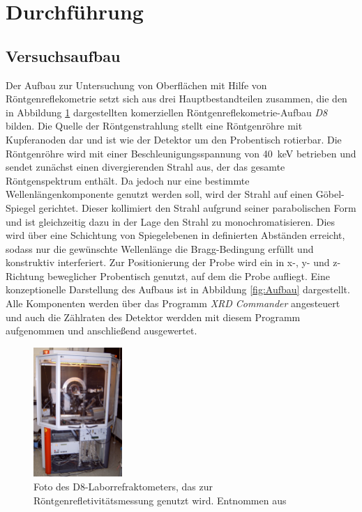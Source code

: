 \newpage
\section{Durchführung}
    \subsection{Versuchsaufbau}
        Der Aufbau zur Untersuchung von Oberflächen mit Hilfe von Röntgenreflekometrie setzt sich aus drei Hauptbestandteilen zusammen, die den in Abbildung \ref{fig:D8} dargestellten komerziellen 
        Röntgenreflekometrie-Aufbau \textit{D8} bilden. Die Quelle der Röntgenstrahlung stellt eine Röntgenröhre mit Kupferanoden dar und ist 
        wie der Detektor um den Probentisch rotierbar. Die Röntgenröhre wird mit einer Beschleunigungsspannung von \SI{40}{\kilo\electronvolt} betrieben und sendet zunächst einen divergierenden Strahl aus, 
        der das gesamte Röntgenspektrum enthält. Da jedoch nur eine bestimmte Wellenlängenkomponente genutzt werden soll, wird der Strahl auf einen Göbel-Spiegel gerichtet. Dieser kollimiert den Strahl 
        aufgrund seiner parabolischen Form und ist gleichzeitig dazu in der Lage den Strahl zu monochromatisieren. Dies wird über eine Schichtung von Spiegelebenen in definierten Abständen erreicht, sodass
        nur die gewünschte Wellenlänge die Bragg-Bedingung erfüllt und konstruktiv interferiert. Zur Positionierung der Probe wird ein in x-, y- und z-Richtung beweglicher Probentisch genutzt, auf dem die 
        Probe aufliegt. Eine konzeptionelle Darstellung des Aufbaus ist in Abbildung \ref{fig:Aufbau} dargestellt. Alle Komponenten werden über das Programm \textit{XRD Commander} angesteuert und auch die 
        Zählraten des Detektor werdden mit diesem Programm aufgenommen und anschließend ausgewertet.



        \begin{figure}[h]
            \centering
            \includegraphics[width = 0.3\textwidth]{pictures/Bild_D8.png}
            \caption{Foto des D8-Laborrefraktometers, das zur Röntgenrefletivitätsmessung genutzt wird. Entnommen aus \cite{tu_dortmund_versuchsanleitung_2022}}
            \label{fig:D8}
        \end{figure}

